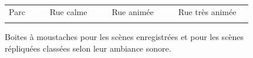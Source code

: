 {\begin{figure}[h]
\centering
{}

\begin{tabular}{|p{1.5cm}|l|p{0.001cm}|p{2cm}|l|p{0.001cm}|p{2cm}|l|p{0.001cm}|p{2.75cm}|l|}
\hhline{|-|-|~|-|-|~|-|-|~|-|-|}
Parc & {\cellcolor[HTML]{5AB25A}} & & Rue calme & {\cellcolor[HTML]{FFCB2F}} & & Rue animée & {\cellcolor[HTML]{F56B00}} & &  Rue très animée & {\cellcolor[HTML]{9A0000}}\\
\hhline{|-|-|~|-|-|~|-|-|~|-|-|}
\end{tabular}

\caption{Boites à moustaches pour les scènes enregistrées   et pour les scènes répliquées  classées selon leur ambiance sonore.}
\label{fig:boxplot_scene}
\end{figure}

}
